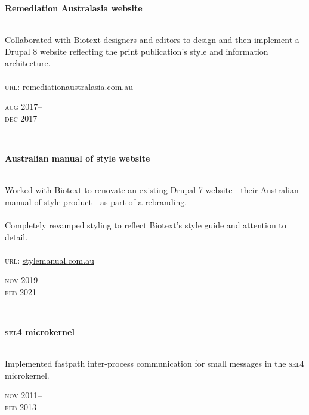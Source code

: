 \begin{minipage}[t]{\mainboxwidth\textwidth}
\textbf{Remediation Australasia website}\\
{\small
\\
Collaborated with Biotext designers and editors to design and then implement a Drupal 8 website reflecting
the print publication's style and information architecture. \\
\\
\textsc{url}: \href{https://www.remediationaustralasia.com.au/}{remediationaustralasia.com.au} 
\par
}
\end{minipage}
\begin{minipage}[t]{\detailboxwidth\textwidth}
{
\hfill \textsc{aug} 2017--\\ 
\hspace*{0pt} \hfill \textsc{dec} 2017
\par
}
\end{minipage}
\\

\begin{minipage}[t]{\mainboxwidth\textwidth}
\textbf{Australian manual of style website}\\
{\small
\\
Worked with Biotext to renovate an existing Drupal 7 website—their Australian manual of style product—as part of a rebranding.\\
\\
Completely revamped styling to reflect Biotext's style guide and attention to detail.\\ 
\\
\textsc{url}: \href{https://stylemanual.com.au}{stylemanual.com.au} 
\par
}
\end{minipage}
\begin{minipage}[t]{\detailboxwidth\textwidth}
{
\hfill \textsc{nov} 2019--\\ 
\hspace*{0pt} \hfill \textsc{feb} 2021
\par
}
\end{minipage}
\\

\begin{minipage}[t]{\mainboxwidth\textwidth}
\textbf{\textsc{sel4} microkernel}\\
{\small
\\
Implemented fastpath inter-process communication for small messages in the \textsc{sel4} microkernel.\\
\par
}
\end{minipage}
\begin{minipage}[t]{\detailboxwidth\textwidth}
{
\hfill \textsc{nov} 2011--\\ 
\hspace*{0pt} \hfill \textsc{feb} 2013
\par
}
\end{minipage}

